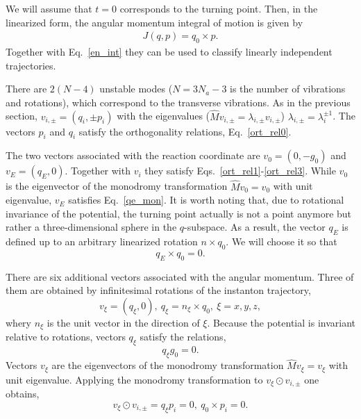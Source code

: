 \documentclass[journal=jpcafh,manuscript=article]{achemso}
\begin{document}
We will assume that $t=0$ corresponds to the turning point. Then, in
the linearized form, the angular momentum integral of motion is given
by
\begin{eqnarray}
  \label{am_int}
  J(q, p) = q_0\times p.
\end{eqnarray}
Together with Eq.~\ref{en_int} they can be used to classify linearly
independent trajectories.

There are $2(N - 4)$ unstable modes ($N=3N_a-3$ is the number of
vibrations and rotations), which correspond to the transverse
vibrations. As in the previous section, $v_{i,\pm}= (q_i,\pm p_i)$
with the eigenvalues ($\hat{M}v_{i,\pm}=\lambda_{i,\pm}v_{i,\pm}$)
$\lambda_{i,\pm}=\lambda_i^{\pm1}$. The vectors $p_i$ and $q_i$
satisfy the orthogonality relations, Eq.~\ref{ort_rel0}.

The two vectors associated with the reaction coordinate are
$v_0=(0, -g_0)$ and $v_E=(q_E, 0)$. Together with $v_i$ they satisfy
Eqs.~\ref{ort_rel1}-\ref{ort_rel3}. While $v_0$ is the eigenvector of
the monodromy transformation $\hat{M}v_0=v_0$ with unit eigenvalue,
$v_E$ satisfies Eq.~\ref{qe_mon}.  It is worth noting that, due
to rotational invariance of the potential, the turning point actually
is not a point anymore but rather a three-dimensional sphere in the
$q$-subspace. As a result, the vector $q_E$ is defined up to
an arbitrary linearized rotation $n\times q_0$. We will choose it
so that
\begin{equation}
  \label{ort_rel9}
  q_E\times q_0=0.
\end{equation}

There are six additional vectors associated with the angular
momentum. Three of them are obtained by infinitesimal rotations of the
instanton trajectory,
\begin{equation}
  \label{am_rot}
v_\xi=(q_\xi,0),\  q_\xi=n_\xi\times q_0,\ \xi=x,y,z,
\end{equation}
whery $n_\xi$ is the unit vector in the direction of $\xi$. Because
the potential is invariant relative to rotations, vectors $q_\xi$
satisfy the relations,
\begin{equation}
  \label{ort_rel4}
  q_\xi g_0=0.
\end{equation}
Vectors $v_\xi$ are the eigenvectors of the monodromy transformation
$\hat{M}v_\xi=v_\xi$ with unit eigenvalue. Applying the monodromy
transformation to $v_\xi\odot v_{i,\pm}$ one obtains,
\begin{equation}
  \label{ort_rel5}
  v_\xi\odot v_{i,\pm}= q_\xi p_i =0,\ q_0\times p_i=0.
\end{equation}
\end{document}
